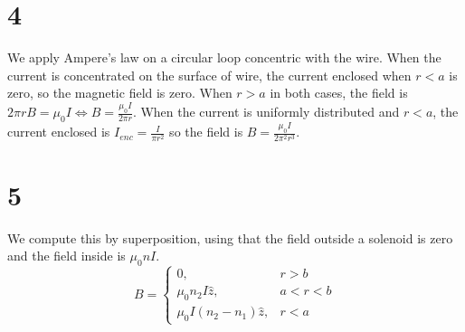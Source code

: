 \documentclass{article}\usepackage{amsmath}
\begin{document}
\section*{4}
We apply Ampere's law on a circular loop concentric with the wire. When the current is concentrated on the surface of wire, the current enclosed when $r < a$ is zero, so the magnetic field is zero. When $r > a$ in both cases, the field is $2\pi rB=\mu_0I\Leftrightarrow B = \frac{\mu_0 I}{2\pi r}$.
When the current is uniformly distributed and $r < a$, the current enclosed is $I_{enc}=\frac{I}{\pi r^2}$ so the field is $B=\frac{\mu_0I}{2\pi^2r^3}$.

\section*{5}
We compute this by superposition, using that the field outside a solenoid is zero and the field inside is $\mu_0n I$.
\[B=\begin{cases}
    0, & r > b \\
    \mu_0n_2I\hat{z}, & a < r < b \\
    \mu_0I(n_2-n_1)\hat{z}, & r < a
  \end{cases}\]
\end{document}
